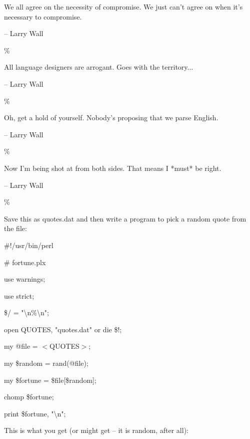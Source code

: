 \documentclass[a4paper,11pt]{book}
\begin{document}
\noindent 

\noindent We all agree on the necessity of compromise.  We just can't agree on when it's necessary to compromise.

\noindent -- Larry Wall

\noindent \%

\noindent All language designers are arrogant.  Goes with the territory...

\noindent -- Larry Wall

\noindent \%

\noindent Oh, get a hold of yourself. Nobody's proposing that we parse English.

\noindent -- Larry Wall

\noindent \%

\noindent Now I'm being shot at from both sides. That means I *must* be right.

\noindent -- Larry Wall

\noindent \%

\noindent 

\noindent 

\noindent Save this as quotes.dat and then write a program to pick a random quote from the file:

\noindent 

\noindent \#!/usr/bin/perl

\noindent \# fortune.plx

\noindent use warnings;

\noindent use strict;

\noindent 

\noindent \$/ = "\textbackslash n\%\textbackslash n";

\noindent 

\noindent open QUOTES, "quotes.dat" or die \$!;

\noindent my @file = $<$QUOTES$>$;

\noindent 

\noindent my \$random = rand(@file);

\noindent my \$fortune = \$file[\$random];

\noindent chomp \$fortune;

\noindent 

\noindent print \$fortune, "\textbackslash n";

\noindent 

\noindent This is what you get (or might get -- it is random, after all):

\noindent 
\end{document}
